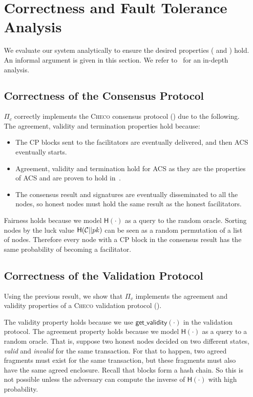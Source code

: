 \section{Correctness and Fault Tolerance Analysis}
\label{sec:analysis}
We evaluate our system analytically to ensure the desired properties ( and ) hold.
An informal argument is given in this section.
We refer to~\cite[Chapter 4]{checo} for an in-depth analysis.

\subsection{Correctness of the Consensus Protocol}
$\Pi_c$ correctly implements the \textsc{Checo} consensus protocol () due to the following.
The agreement, validity and termination properties hold because:
\begin{itemize}
    \item The CP blocks sent to the facilitators are eventually delivered, and then ACS eventually starts.
    \item Agreement, validity and termination hold for ACS as they are the properties of ACS and are proven to hold in~\cite{miller2016honey}.
    \item The consensus result and signatures are eventually disseminated to all the nodes,
        so honest nodes must hold the same result as the honest facilitators.
\end{itemize}
Fairness holds because we model $\textsf{H}(\cdot)$ as a query to the random oracle.
Sorting nodes by the luck value $\textsf{H}(\mathcal{C} || pk)$ can be seen as a random permutation of a list of nodes.
Therefore every node with a CP block in the consensus result has the same probability of becoming a facilitator.

\subsection{Correctness of the Validation Protocol}
\label{sec:correctness-of-validity}
Using the previous result,
we show that $\Pi_v$ implements the agreement and validity properties of a \textsc{Checo} validation protocol ().

The validity property holds because we use $\textsf{get\_validity}(\cdot)$ in the validation protocol.
The agreement property holds because we model $\textsf{H}(\cdot)$ as a query to a random oracle.
That is, suppose two honest nodes decided on two different states, \emph{valid} and \emph{invalid} for the same transaction.
For that to happen, two agreed fragments must exist for the same transaction,
but these fragments must also have the same agreed enclosure.
Recall that blocks form a hash chain.
So this is not possible unless the adversary can compute the inverse of $\textsf{H}(\cdot)$ with high probability.

